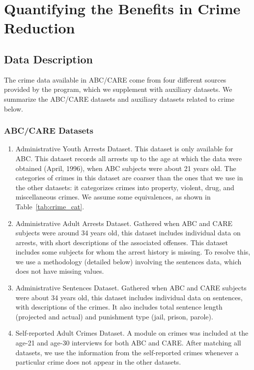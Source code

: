 \section{Quantifying the Benefits in Crime Reduction} \label{appendix:crime}

\subsection{Data Description}
\label{appendix:crime-data-description}

\noindent The crime data available in ABC/CARE come from four different sources provided by the program, which we supplement with auxiliary datasets. We summarize the ABC/CARE datasets and auxiliary datasets related to crime below. 

\subsubsection{ABC/CARE Datasets}
\begin{enumerate}
\item Administrative Youth Arrests Dataset.  This dataset is only available for ABC. This dataset records all arrests up to the age at which the data were obtained (April, 1996), when ABC subjects were about 21 years old. The categories of crimes in this dataset are coarser than the ones that we use in the other datasets: it categorizes crimes into property, violent, drug, and miscellaneous crimes. We assume some equivalences, as shown in Table~\ref{tab:crime_cat}.
\item Administrative Adult Arrests Dataset. Gathered when ABC and CARE subjects were around 34 years old, this dataset includes individual data on arrests, with short descriptions of the associated offenses. This dataset includes some subjects for whom the arrest history is missing. To resolve this, we use a methodology (detailed below) involving the sentences data, which does not have missing values.
\item Administrative Sentences Dataset. Gathered when ABC and CARE subjects were about 34 years old, this dataset includes individual data on sentences, with descriptions of the crimes. It also includes total sentence length (projected and actual) and punishment type (jail, prison, parole).
\item Self-reported Adult Crimes Dataset. A module on crimes was included at the age-21 and age-30 interviews for both ABC and CARE. After matching all datasets, we use the information from the self-reported crimes whenever a particular crime does not appear in the other datasets.
\end{enumerate}

